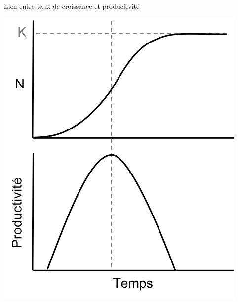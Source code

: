 \documentclass[11pt, compress, aspectratio=1610]{beamer}
\begin{document}
\begin{frame}{Lien entre taux de croissance et productivité}
\protect\hypertarget{lien-entre-taux-de-croissance-et-productivituxe9}{}

\centering

\includegraphics[scale=0.7]{figures/productivite.png}

\par

\end{frame}
\end{document}
